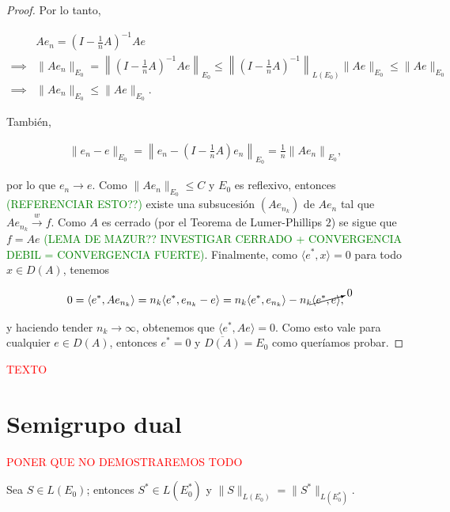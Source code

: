 \begin{proof}
    Por lo tanto, 

    \begin{align*}
        &Ae_n = \left(I - \frac{1}{n}A\right)^{-1}Ae\\
        \implies& \lVert Ae_n \rVert_{E_0} = \left \lVert \left(I - \frac{1}{n}A\right)^{-1}Ae\right \rVert_{E_0} \leq \left \lVert \left(I - \frac{1}{n}A\right)^{-1}\right \rVert_{L(E_0)} \lVert Ae \rVert_{E_0} \leq \lVert Ae \rVert_{E_0}\\
        \implies& \lVert Ae_n \rVert_{E_0} \leq \lVert Ae \rVert_{E_0}.
    \end{align*}

    También,

    \begin{align*}
        \lVert e_n - e\rVert_{E_0} = \left \lVert e_n - \left(I - \frac{1}{n}A\right)e_n \right \rVert_{E_0} = \frac{1}{n}\left \lVert Ae_n \right \rVert_{E_0},
    \end{align*}

    por lo que $e_n \rightarrow e$. Como $\lVert Ae_n \rVert_{E_0} \leq C$ y $E_0$ es reflexivo, entonces \textcolor{green}{(REFERENCIAR ESTO??)} existe una subsucesión $(Ae_{n_k})$ de $Ae_n$ tal que $Ae_{n_k} \xrightarrow{w} f$. Como $A$ es  cerrado (por el Teorema de Lumer-Phillips $2$) se sigue que $f = Ae$ \textcolor{green}{(LEMA DE MAZUR?? INVESTIGAR CERRADO + CONVERGENCIA DEBIL = CONVERGENCIA FUERTE)}. Finalmente, como $\langle e^*, x \rangle = 0$ para todo $x \in D(A)$, tenemos

    \[0 = \langle e^*, Ae_{n_k}\rangle = n_k \langle e^*, e_{n_k} - e \rangle = n_k \langle e^*, e_{n_k}\rangle - n_k \cancelto{0}{\langle e^*, e\rangle},\]

    y haciendo tender $n_k \rightarrow \infty$, obtenemos que $\langle e^*, Ae\rangle = 0$. Como esto vale para cualquier $e \in D(A)$, entonces $e^* = 0$ y $\overline{D(A)} = E_0$ como queríamos probar.
\end{proof}

\textcolor{red}{TEXTO}

\section{Semigrupo dual}
\label{ch:semigrupos:section:dual}

\textcolor{red}{PONER QUE NO DEMOSTRAREMOS TODO}\\

\begin{Lema}
    \label{ch:semigrupos:section:dual:lema:adjuntoLema}

    Sea $S \in L(E_0)$; entonces $S^* \in L(E_0^*)$ y $\lVert S \rVert_{L(E_0)} = \lVert S^* \rVert_{L(E_0^*)}$.
\end{Lema}

